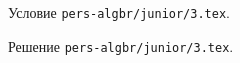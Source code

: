 \problem
Условие \texttt{pers-algbr/junior/3.tex}.

\solution Решение \texttt{pers-algbr/junior/3.tex}.
\endproblem
